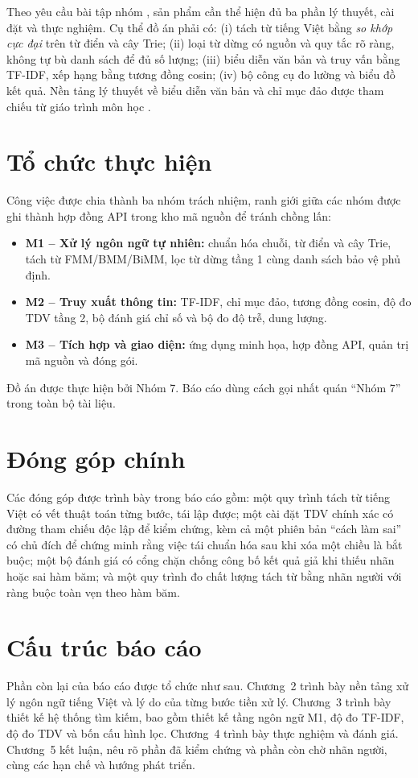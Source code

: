 Theo yêu cầu bài tập nhóm \cite{baigiang}, sản phẩm cần thể hiện đủ ba phần lý
thuyết, cài đặt và thực nghiệm. Cụ thể đồ án phải có: (i) tách từ tiếng Việt bằng
\emph{so khớp cực đại} trên từ điển và cây Trie; (ii) loại từ dừng có nguồn và
quy tắc rõ ràng, không tự bù danh sách để đủ số lượng; (iii) biểu diễn văn bản và
truy vấn bằng TF-IDF, xếp hạng bằng tương đồng cosin; (iv) bộ công cụ đo lường và
biểu đồ kết quả. Nền tảng lý thuyết về biểu diễn văn bản và chỉ mục đảo được tham
chiếu từ giáo trình môn học \cite{giaotrinh}.

\section{Tổ chức thực hiện}

Công việc được chia thành ba nhóm trách nhiệm, ranh giới giữa các nhóm được ghi
thành hợp đồng API trong kho mã nguồn để tránh chồng lấn:

\begin{itemize}
  \item \textbf{M1 -- Xử lý ngôn ngữ tự nhiên:} chuẩn hóa chuỗi, từ điển và cây
        Trie, tách từ FMM/BMM/BiMM, lọc từ dừng tầng 1 cùng danh sách bảo vệ
        phủ định.
  \item \textbf{M2 -- Truy xuất thông tin:} TF-IDF, chỉ mục đảo, tương đồng
        cosin, độ đo TDV tầng 2, bộ đánh giá chỉ số và bộ đo độ trễ, dung lượng.
  \item \textbf{M3 -- Tích hợp và giao diện:} ứng dụng minh họa, hợp đồng API,
        quản trị mã nguồn và đóng gói.
\end{itemize}

Đồ án được thực hiện bởi Nhóm 7. Báo cáo dùng cách gọi nhất quán ``Nhóm 7'' trong
toàn bộ tài liệu.

\section{Đóng góp chính}

Các đóng góp được trình bày trong báo cáo gồm: một quy trình tách từ tiếng Việt
có vết thuật toán từng bước, tái lập được; một cài đặt TDV chính xác có đường
tham chiếu độc lập để kiểm chứng, kèm cả một phiên bản ``cách làm sai'' có chủ
đích để chứng minh rằng việc tái chuẩn hóa sau khi xóa một chiều là bắt buộc; một
bộ đánh giá có cổng chặn chống công bố kết quả giả khi thiếu nhãn hoặc sai hàm
băm; và một quy trình đo chất lượng tách từ bằng nhãn người với ràng buộc toàn vẹn
theo hàm băm.

\section{Cấu trúc báo cáo}

Phần còn lại của báo cáo được tổ chức như sau. Chương~2 trình bày nền tảng xử lý
ngôn ngữ tiếng Việt và lý do của từng bước tiền xử lý. Chương~3 trình bày thiết kế
hệ thống tìm kiếm, bao gồm thiết kế tầng ngôn ngữ M1, độ đo TF-IDF, độ đo TDV và
bốn cấu hình lọc. Chương~4 trình bày thực nghiệm và đánh giá. Chương~5 kết luận,
nêu rõ phần đã kiểm chứng và phần còn chờ nhãn người, cùng các hạn chế và hướng
phát triển.

